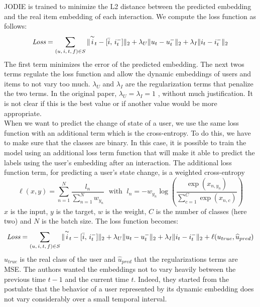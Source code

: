 JODIE is trained to minimize the L2 distance between the predicted embedding and the real item embedding of each interaction. We compute the loss function as follows:
\begin{equation}
    \textit{Loss} = \sum_{(u,\,i,\,t,\,f) \in S} \| \overset{\sim}{i}_t - [\Bar{i},\,i_t^-] \|_2 + \lambda_U \|u_t - u_t^-\|_2 + \lambda_I \|i_t - i_t^-\|_2
\end{equation}
The first term minimizes the error of the predicted embedding. The next twos terms regulate the loss function and allow the dynamic embeddings of users and items to not vary too much. $\lambda_U$ and $\lambda_I$ are the regularization terms that penalize the two terms. In the original paper,  $\lambda_U = \lambda_I = 1$ , without much justification. It is not clear if this is the best value or if another value would be more appropriate. \\

When we want to predict the change of state of a user, we use the same loss function with an additional term which is the cross-entropy. To do this, we have to make sure that the classes are binary. In this case, it is possible to train the model using an additional loss term function that will make it able to predict the labels using the user's embedding after an interaction. The additional loss function term, for predicting a user's state change, is a weighted cross-entropy 
\begin{equation}
\ell(x,y) = \sum_{n=1}^N \frac{l_n}{\sum_{n=1}^N w_{y_n}} \; \text{ with } \;
l_n = -w_{y_n} \log \left ( \frac{\exp(x_{n,y_n})}{\sum_{c=1}^C \exp(x_{n,c})} \right )
\end{equation}
 $x$ is the input, $y$ is the target, $w$ is the weight, $C$ is the number of classes (here two) and $N$ is the batch size. The loss function becomes:
\begin{equation}
    \textit{Loss} = \sum_{(u,\,i,\,t,\,f) \in S} \| \overset{\sim}{i}_t - [\Bar{i},\,i_t^-] \|_2 + \lambda_U \|u_t - u_t^-\|_2 + \lambda_I \|i_t - i_t^-\|_2 + \ell (u_{true}, \widehat u_{pred})
\end{equation}
 $u_{true}$ is the real class of the user and $\widehat u_{pred}$   that the regularizations terms are MSE. The authors wanted the embeddings not to vary heavily between the previous time $t-1$ and the current time $t$. Indeed, they started from the postulate that the behavior of a user represented by its dynamic embedding does not vary considerably over a small temporal interval.\\

